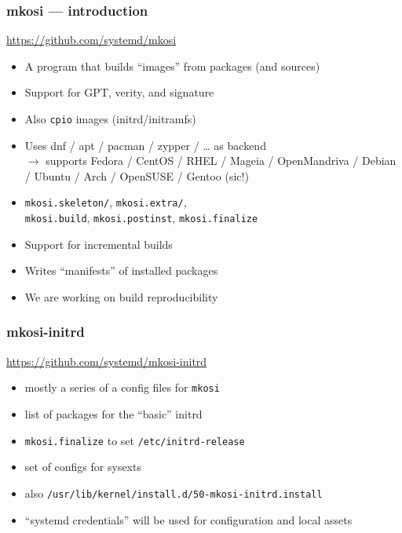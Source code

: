 \documentclass[]{beamer}
\newcommand\pp{}
\begin{document}
\begin{frame}[fragile]
  \frametitle{mkosi — introduction}

  \url{https://github.com/systemd/mkosi}

  \pp

  \begin{itemize}
  \item A program that builds ``images'' from packages (and sources)
    \pp
  \item Support for GPT, verity, and signature
    \pp
  \item Also \texttt{cpio} images (initrd/initramfs)
    \pp
  \item Uses dnf / apt / pacman / zypper / … as backend\\
    \pp
    $\longrightarrow{}$ supports Fedora / CentOS / RHEL / Mageia / OpenMandriva / Debian / Ubuntu / Arch / OpenSUSE / Gentoo (sic!)
    \pp
  \item \texttt{mkosi.skeleton/}, \texttt{mkosi.extra/}, \\
        \texttt{mkosi.build}, \texttt{mkosi.postinst}, \texttt{mkosi.finalize}
    \pp
  \item Support for incremental builds
    \pp
  \item Writes ``manifests'' of installed packages
  \item We are working on build reproducibility
  \end{itemize}
\end{frame}

\begin{frame}[fragile]
  \frametitle{mkosi-initrd}

  \url{https://github.com/systemd/mkosi-initrd}

  \quad

  \pp

  \begin{itemize}
  \item mostly a series of a config files for \texttt{mkosi}
    \pp
  \item list of packages for the ``basic'' initrd
    \pp
  \item \texttt{mkosi.finalize} to set \texttt{/etc/initrd-release}
    \pp
  \item set of configs for sysexts

  \quad

    \pp
  \item also \texttt{/usr/lib/kernel/install.d/50-mkosi-initrd.install}

  \quad
    \pp
  \item ``systemd credentials'' will be used for configuration and local assets
  \end{itemize}
\end{frame}
\end{document}
